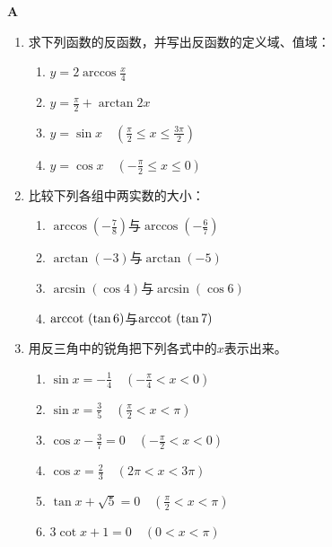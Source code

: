 \begin{center}
\bfseries A
\end{center}

\begin{enumerate}
    \item 求下列函数的反函数，并写出反函数的定义域、值域：
\begin{multicols}{2}
\begin{enumerate}[(1)]
    \item $y=2\arccos\frac{x}{4}$
    \item $y=\frac{\pi}{2}+\arctan 2x$
    \item $y=\sin x\quad \left(\frac{\pi}{2}\le x\le \frac{3\pi}{2}\right)$
    \item $y=\cos x\quad \left(-\frac{\pi}{2}\le x\le 0\right)$
\end{enumerate}
\end{multicols}

\item 比较下列各组中两实数的大小：
\begin{multicols}{2}
\begin{enumerate}[(1)]
    \item $\arccos\left(-\frac{7}{8}\right)$与$\arccos\left(-\frac{6}{7}\right)$
    \item $\arctan\left(-3\right)$与$\arctan\left(-5\right)$
    \item $\arcsin\left(\cos 4\right)$与$\arcsin\left(\cos 6\right)$
    \item ${\rm arccot\,}\left(\tan 6\right)$与${\rm arccot\,}\left(\tan {7}\right)$
\end{enumerate}
\end{multicols}

\item 用反三角中的锐角把下列各式中的$x$表示出来。
\begin{multicols}{2}
\begin{enumerate}[(1)]
    \item $\sin x=-\frac{1}{4}\quad \left(-\frac{\pi}{4}<x<0\right)$
    \item $\sin x=\frac{3}{5}\quad \left(\frac{\pi}{2}<x<\pi\right)$
    \item $\cos x-\frac{3}{7}=0\quad \left(-\frac{\pi}{2}<x<0\right)$
    \item $\cos x=\frac{2}{3}\quad \left(2\pi<x<3\pi\right)$
    \item $\tan x+\sqrt{5}=0\quad \left(\frac{\pi}{2}<x<\pi\right)$
    \item $3\cot x+1=0\quad \left(0<x<\pi\right)$
\end{enumerate}
\end{multicols}


\end{enumerate}
